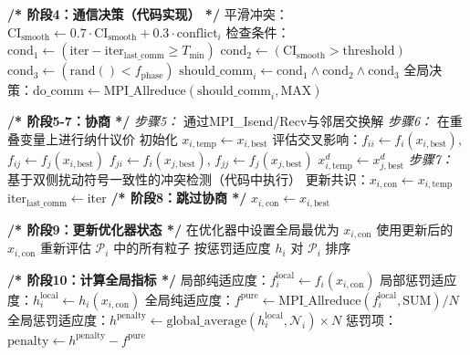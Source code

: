 \documentclass[11pt,a3paper]{ctexart}
\begin{document}
\begin{algorithmic}[1]
     \State \textbf{/* 阶段4：通信决策（代码实现） */}
    \State 平滑冲突：$\text{CI}_{\text{smooth}} \gets 0.7 \cdot \text{CI}_{\text{smooth}} + 0.3 \cdot \text{conflict}_i$
    \State 检查条件：
    \State \quad $\text{cond}_1 \gets (\text{iter} - \text{iter}_{\text{last\_comm}} \geq T_{\min})$ 
    \State \quad $\text{cond}_2 \gets (\text{CI}_{\text{smooth}} > \text{threshold})$ 
    \State \quad $\text{cond}_3 \gets (\text{rand}() < f_{\text{phase}})$ 
    \State $\text{should\_comm}_i \gets \text{cond}_1 \land \text{cond}_2 \land \text{cond}_3$
    \State 全局决策：$\text{do\_comm} \gets \text{MPI\_Allreduce}(\text{should\_comm}_i, \text{MAX})$
    
        \State \textbf{/* 阶段5-7：协商 */}
        \State \textit{步骤5：} 通过MPI\_Isend/Recv与邻居交换解
        \State \textit{步骤6：} 在重叠变量上进行纳什议价
        \State \quad 初始化 $x_{i,\text{temp}} \gets x_{i,\text{best}}$
            \State 评估交叉影响：$f_{ii} \gets f_i(x_{i,\text{best}})$, $f_{ij} \gets f_j(x_{i,\text{best}})$
            \State \quad\quad\quad\quad\quad\quad\quad $f_{ji} \gets f_i(x_{j,\text{best}})$, $f_{jj} \gets f_j(x_{j,\text{best}})$
                \State $x_{i,\text{temp}}^d \gets x_{j,\text{best}}^d$ 
            \EndIf
        \EndFor
        \State \textit{步骤7：} 基于双侧扰动符号一致性的冲突检测（代码中执行）
        \State 更新共识：$x_{i,\text{con}} \gets x_{i,\text{temp}}$
        \State $\text{iter}_{\text{last\_comm}} \gets \text{iter}$
    \Else
        \State \textbf{/* 阶段8：跳过协商 */}
        \State $x_{i,\text{con}} \gets x_{i,\text{best}}$ 
    \EndIf
    
    \State \textbf{/* 阶段9：更新优化器状态 */}
    \State 在优化器中设置全局最优为 $x_{i,\text{con}}$
    \State 使用更新后的 $x_{i,\text{con}}$ 重新评估 $\mathcal{P}_i$ 中的所有粒子
    \State 按惩罚适应度 $h_i$ 对 $\mathcal{P}_i$ 排序
    
    \State \textbf{/* 阶段10：计算全局指标 */}
    \State 局部纯适应度：$f_i^{\text{local}} \gets f_i(x_{i,\text{con}})$
    \State 局部惩罚适应度：$h_i^{\text{local}} \gets h_i(x_{i,\text{con}})$
    \State 全局纯适应度：$f^{\text{pure}} \gets \text{MPI\_Allreduce}(f_i^{\text{local}}, \text{SUM}) / N$
    \State 全局惩罚适应度：$h^{\text{penalty}} \gets \text{global\_average}(h_i^{\text{local}}, \mathcal{N}_i)\times N$
    \State 惩罚项：$\text{penalty} \gets h^{\text{penalty}} - f^{\text{pure}}$
    

\end{algorithmic}
\end{document}
